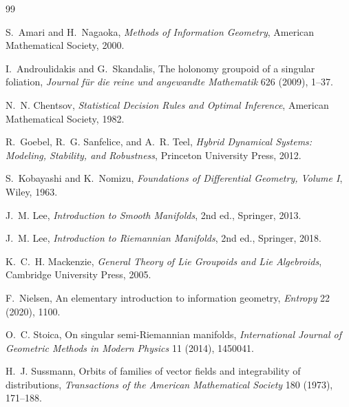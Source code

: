 \documentclass[11pt]{article}
\begin{document}
\begin{thebibliography}{99}

S.~Amari and H.~Nagaoka,
\emph{Methods of Information Geometry},
American Mathematical Society, 2000.

I.~Androulidakis and G.~Skandalis,
The holonomy groupoid of a singular foliation,
\emph{Journal f\"ur die reine und angewandte Mathematik}
626 (2009), 1--37.

N.~N. Chentsov,
\emph{Statistical Decision Rules and Optimal Inference},
American Mathematical Society, 1982.

R.~Goebel, R.~G. Sanfelice, and A.~R. Teel,
\emph{Hybrid Dynamical Systems: Modeling, Stability, and Robustness},
Princeton University Press, 2012.

S.~Kobayashi and K.~Nomizu,
\emph{Foundations of Differential Geometry, Volume I},
Wiley, 1963.

J.~M. Lee,
\emph{Introduction to Smooth Manifolds},
2nd ed., Springer, 2013.

J.~M. Lee,
\emph{Introduction to Riemannian Manifolds},
2nd ed., Springer, 2018.

K.~C.~H. Mackenzie,
\emph{General Theory of Lie Groupoids and Lie Algebroids},
Cambridge University Press, 2005.

F.~Nielsen,
An elementary introduction to information geometry,
\emph{Entropy} 22 (2020), 1100.

O.~C. Stoica,
On singular semi-Riemannian manifolds,
\emph{International Journal of Geometric Methods in Modern Physics}
11 (2014), 1450041.

H.~J. Sussmann,
Orbits of families of vector fields and integrability of distributions,
\emph{Transactions of the American Mathematical Society}
180 (1973), 171--188.

\end{thebibliography}
\end{document}
